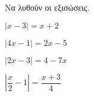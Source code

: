 \item Να λυθούν οι εξισώσεις.
\begin{multicols}{4}
\begin{alist}
\item $ \left|x-3\right|=x+2 $
\item $ \left|4x-1\right|=2x-5 $
\item $ \left|2x-3\right|=4-7x $
\item $ \left|\dfrac{x}{2}-1\right|=\dfrac{x+3}{4} $
\end{alist}
\end{multicols}
